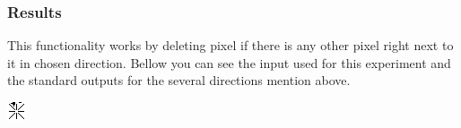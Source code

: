 \subsubsection{Results}
This functionality works by deleting pixel if there is any other pixel right next to it in chosen direction. Bellow you can see the input used for this experiment and the standard outputs for the several directions mention above.

\begin{center}
\begin{minipage}{0.5\linewidth}
	\centering
	\includegraphics[width=0.8\linewidth]{./Experiments/DirectionalDeletations/fig/Input.png} 
\end{minipage}
\end{center}


